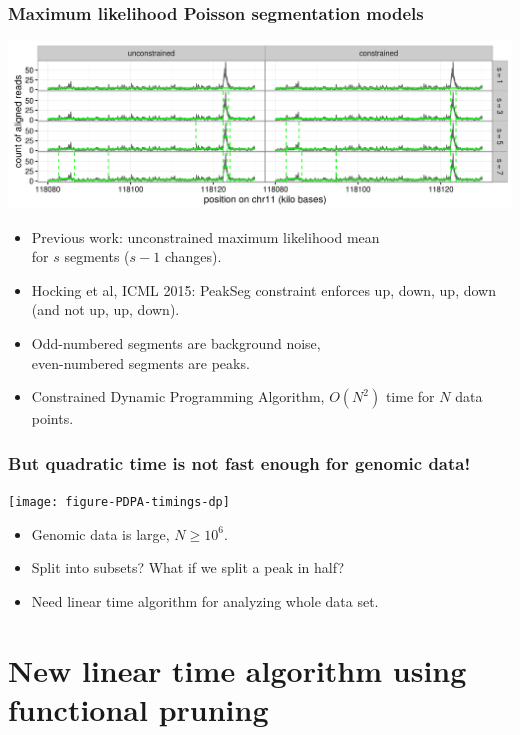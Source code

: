 \documentclass{beamer}
\begin{document}
\begin{frame}
  \frametitle{Maximum likelihood Poisson segmentation models}
  \includegraphics[width=1\textwidth]{figure-Segmentor-PeakSeg}

  \begin{itemize}
  \item Previous work: unconstrained maximum likelihood mean\\
    for $s$ segments ($s-1$ changes).
  \item Hocking et al, ICML 2015: PeakSeg constraint enforces up, down, up,
    down (and not up, up, down). 
  \item Odd-numbered segments are background noise,\\
    even-numbered segments are peaks.
  \item Constrained Dynamic Programming Algorithm, $O(N^2)$ time for $N$ data points.
  \end{itemize}
\end{frame}

\begin{frame}
  \frametitle{But quadratic time is not fast enough for genomic data!}
  \texttt{[image: figure-PDPA-timings-dp]}
  \begin{itemize}
  \item Genomic data is large, $N \geq 10^6$.
  \item Split into subsets? What if we split a peak in half?
  \item Need linear time algorithm for analyzing whole data set.
  \end{itemize}
\end{frame}

\section{New linear time algorithm using functional pruning}
\end{document}
